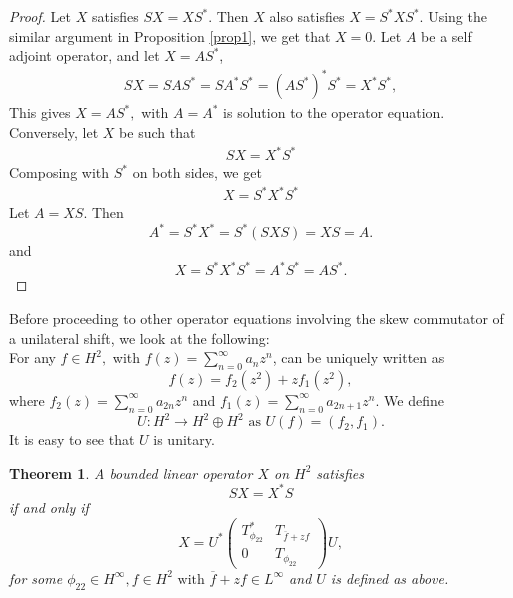 \documentclass[12pt, reqno]{amsart}
\newtheorem{theorem}{Theorem}[section]
\theoremstyle{definition}
\theoremstyle{remark}
\numberwithin{equation}{section}
\begin{document}
        \begin{proof}
           Let $X$ satisfies $SX=XS^*$. Then $X$ also satisfies $X=S^*XS^*.$ Using the similar argument in Proposition \ref{prop1}, we get that $X=0.$
            Let $A$ be a self adjoint operator, and let $X=AS^*$,
            \begin{align*}
                SX=SAS^*=SA^*S^*=(AS^*)^*S^*=X^*S^*,
            \end{align*}
           This gives $X=AS^*,$ with $A=A^*$ is solution to the operator equation. Conversely, let $X$ be such that
            \begin{align*}
                SX=X^*S^* 
            \end{align*}
            Composing with $S^*$ on both sides, we get
            \begin{align}
                X=S^*X^*S^*
            \end{align}
            Let $A=XS$. Then
            \begin{equation*}
                A^*=S^*X^*=S^*(SXS)=XS=A.
            \end{equation*}
            and
            \begin{equation*}
                X=S^*X^*S^* =A^*S^*=AS^*.
            \end{equation*}
           \end{proof}
        Before proceeding to other operator equations involving the skew commutator of a unilateral shift, we look at the following:\\
         For any $f \in H^2,$ with $f(z)=\sum_{n=0}^{\infty} a_nz^n$, can be uniquely written as
        \begin{equation}
            f(z)=f_2(z^2)+zf_1(z^2),
        \end{equation}
        where $f_2(z)=\sum_{n=0}^{\infty} a_{2n}z^{n}$ and $f_1(z)=\sum_{n=0}^{\infty} a_{2n+1}z^{n}$. We define
        \begin{equation*}
            U:H^2\to H^2\oplus H^2 \text{ as } U(f)=(f_2,f_1).
        \end{equation*}
         It is easy to see that $U$ is unitary.
        \begin{theorem}\label{p-3}
           A bounded linear operator $X$ on $H^2$ satisfies 
           $$SX=X^*S$$
           if and only if 
           $$X=U^*\begin{pmatrix}
                 T^*_{\phi_{22}}&T_{\overline{f}+zf}\\
                 0&T_{\phi_{22}}
             \end{pmatrix}U,$$
           for some $ \phi_{22}\in H^{\infty}, f \in H^2 \text{ with } {\overline{f}+zf} \in L^\infty$ and $U$ is defined as above.
        \end{theorem}
\end{document}
